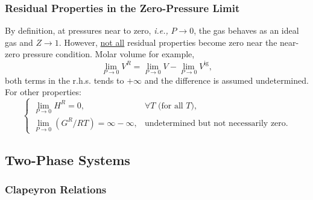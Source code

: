\documentclass[12pts,a4paper,amsmath,amssymb,floatfix]{article}%
\newcommand{\ie}{{\it i.e., }}
\begin{document}
   \subsubsection{Residual Properties in the Zero-Pressure Limit}
      
       By definition, at pressures near to zero, \ie $P\rightarrow 0$, the gas behaves as an ideal gas and $Z\rightarrow 1$. However, \underline{not all} residual properties become zero near the near-zero pressure condition. Molar volume for example,
       \begin{displaymath}
           \lim\limits_{P\rightarrow 0}V^{R} = \lim\limits_{P\rightarrow 0}V - \lim\limits_{P\rightarrow 0}V^{\text{ig}},
       \end{displaymath}
both terms in the r.h.s. tends to $+\infty$ and the difference is assumed undetermined. For other properties:
       \begin{displaymath}
          \begin{cases}
             \lim\limits_{P\rightarrow 0}H^{R} = 0, & \forall T \text{ (for all $T$)}, \\
             \lim\limits_{P\rightarrow 0}\left(G^{R}/RT\right) = \infty-\infty,& \text{undetermined but not necessarily zero}.  
          \end{cases}
       \end{displaymath}


\subsection{Two-Phase Systems}\label{Section:03:Two_Phase}

   \subsubsection{Clapeyron Relations}
\end{document}
